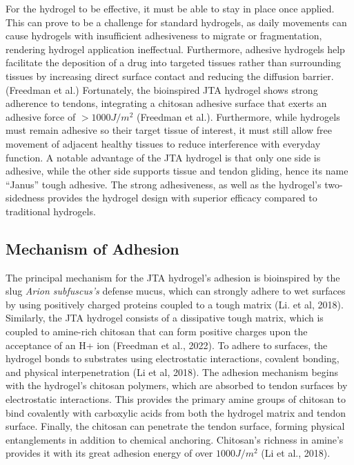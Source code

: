 For the hydrogel to be effective, it must be able to stay in place once applied. This can prove to be a challenge for standard hydrogels, as daily movements can cause hydrogels with insufficient adhesiveness to migrate or fragmentation, rendering hydrogel application ineffectual. Furthermore, adhesive hydrogels help facilitate the deposition of a drug into targeted tissues rather than surrounding tissues by increasing direct surface contact and reducing the diffusion barrier. (Freedman et al.) Fortunately, the bioinspired JTA hydrogel shows strong adherence to tendons, integrating a chitosan adhesive surface that exerts an adhesive force of $>1000J/m^2$ (Freedman et al.). Furthermore, while hydrogels must remain adhesive so their target tissue of interest, it must still allow free movement of adjacent healthy tissues to reduce interference with everyday function. A notable advantage of the JTA hydrogel is that only one side is adhesive, while the other side supports tissue and tendon gliding, hence its name “Janus” tough adhesive. The strong adhesiveness, as well as the hydrogel’s two-sidedness provides the hydrogel design with superior efficacy compared to traditional hydrogels.

\subsection{Mechanism of Adhesion}
The principal mechanism for the JTA hydrogel’s adhesion is bioinspired by the slug \textit{Arion subfuscus’s} defense mucus, which can strongly adhere to wet surfaces by using positively charged proteins coupled to a tough matrix (Li. et al, 2018). Similarly, the JTA hydrogel consists of a dissipative tough matrix, which is coupled to amine-rich chitosan that can form positive charges upon the acceptance of an H+ ion (Freedman et al., 2022). 
To adhere to surfaces, the hydrogel bonds to substrates using electrostatic interactions, covalent bonding, and physical interpenetration (Li et al, 2018). The adhesion mechanism begins with the hydrogel’s chitosan polymers, which are absorbed to tendon surfaces by electrostatic interactions. This provides the primary amine groups of chitosan to bind covalently with carboxylic acids from both the hydrogel matrix and tendon surface. Finally, the chitosan can penetrate the tendon surface, forming physical entanglements in addition to chemical anchoring. Chitosan’s richness in amine’s provides it with its great adhesion energy of over $1000J/m^2$ (Li et al., 2018).

